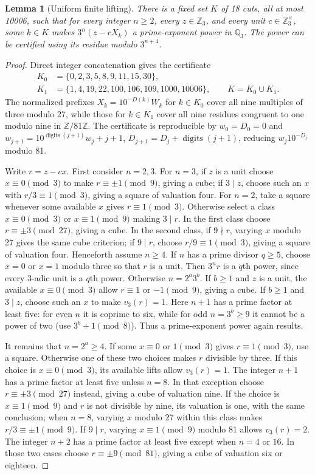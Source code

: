 \documentclass[10pt]{article}
\newtheorem{lemma}{Lemma}
\begin{document}
\begin{lemma}[Uniform finite lifting]\label{lem:uniform-lifting}
There is a fixed set $K$ of 18 cuts, all at most 10006, such that for
every integer $n\ge2$, every $z\in\mathbb Z_3$, and every unit
$c\in\mathbb Z_3^\times$, some $k\in K$ makes
$3^n(z-cX_k)$ a prime-exponent power in $\mathbb Q_3$.
The power can be certified using its residue modulo $3^{n+4}$.
\end{lemma}
\begin{proof}
Direct integer concatenation gives the certificate
\[
\begin{split}
K_0&=\{0,2,3,5,8,9,11,15,30\},\\
K_1&=\{1,4,19,22,100,106,109,1000,10006\},\qquad K=K_0\cup K_1.
\end{split}
\]
The normalized prefixes $X_k=10^{-D(k)}W_k$ for $k\in K_0$
cover all nine multiples of three modulo 27, while those for $k\in K_1$
cover all nine residues congruent to one modulo nine in $\mathbb Z/81\mathbb Z$.
The certificate is reproducible by
$w_0=D_0=0$ and
$w_{j+1}=10^{\operatorname{digits}(j+1)}w_j+j+1$,
$D_{j+1}=D_j+\operatorname{digits}(j+1)$, reducing
$w_j10^{-D_j}$ modulo 81.

Write $r=z-cx$. First consider $n=2,3$.
For $n=3$, if $z$ is a unit choose $x\equiv0\pmod3$ to make
$r\equiv\pm1\pmod9$, giving a cube; if $3\mid z$, choose such
an $x$ with $r/3\equiv1\pmod3$, giving a square of valuation four.
For $n=2$, take a square whenever some available $x$ gives
$r\equiv1\pmod3$. Otherwise select a class $x\equiv0\pmod3$
or $x\equiv1\pmod9$ making $3\mid r$.
In the first class choose $r\equiv\pm3\pmod{27}$, giving a cube.
In the second class, if $9\nmid r$, varying $x$ modulo 27 gives the
same cube criterion; if $9\mid r$, choose $r/9\equiv1\pmod3$,
giving a square of valuation four.
Henceforth assume $n\ge4$.
If $n$ has a prime divisor $q\ge5$, choose $x=0$ or
$x=1$ modulo three so that $r$ is a unit. Then $3^nr$ is a $q$th
power, since every 3-adic unit is a $q$th power.
Otherwise $n=2^a3^b$.
If $b\ge1$ and $z$ is a unit, the available $x\equiv0\pmod3$
allow $r\equiv1$ or $-1\pmod9$, giving a cube.
If $b\ge1$ and $3\mid z$, choose such an $x$ to make $v_3(r)=1$.
Here $n+1$ has a prime factor at least five: for even $n$ it is
coprime to six, while for odd $n=3^b\ge9$ it cannot be a power of
two (use $3^b+1\pmod8$). Thus a prime-exponent power again results.

It remains that $n=2^a\ge4$. If some $x\equiv0$ or $1\pmod3$
gives $r\equiv1\pmod3$, use a square. Otherwise one of these two
choices makes $r$ divisible by three.
If this choice is $x\equiv0\pmod3$, its available lifts allow
$v_3(r)=1$. The integer $n+1$ has a prime factor at least five unless
$n=8$. In that exception choose $r\equiv\pm3\pmod{27}$ instead,
giving a cube of valuation nine.
If the choice is $x\equiv1\pmod9$ and $r$ is not divisible by nine,
its valuation is one, with the same conclusion; when $n=8$, varying
$x$ modulo 27 within this class makes $r/3\equiv\pm1\pmod9$.
If $9\mid r$, varying $x\equiv1\pmod9$ modulo 81 allows
$v_3(r)=2$. The integer $n+2$ has a prime factor at least five except
when $n=4$ or $16$. In those two cases choose
$r\equiv\pm9\pmod{81}$, giving a cube of valuation six or eighteen.


\end{proof}
\end{document}
